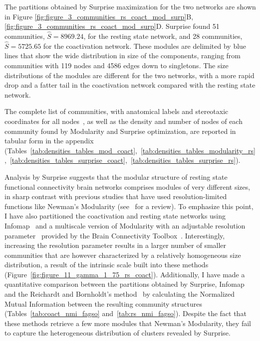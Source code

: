 The partitions obtained by Surprise maximization for the two networks are shown in Figure \ref{fig:figure_3_communities_rs_coact_mod_surp}B, \ref{fig:figure_3_communities_rs_coact_mod_surp}D. Surprise found 51 communities, $\hat{S}=8969.24$, for the resting state network, and 28 communities, $\hat{S}=5725.65$ for the coactivation network.
These modules are delimited by blue lines that show the wide distribution in size of the components, ranging from communities with 119 nodes and 4586 edges down to singletons.
The size distributions of the modules are different for the two networks, with a more rapid drop and a fatter tail in the coactivation network compared with the resting state network.

The complete list of communities, with anatomical labels and stereotaxic coordinates for all nodes~\cite{laird2010,lancaster2007,tzourio2002}, as well as the density and number of nodes of each community found by Modularity and Surprise optimization, are reported in tabular form in the appendix (Tables~\ref{tab:densities_tables_mod_coact},~\ref{tab:densities_tables_modularity_rs},~\ref{tab:densities_tables_surprise_coact},~\ref{tab:densities_tables_surprise_rs}).

Analysis by Surprise suggests that the modular structure of resting state functional connectivity brain networks comprises modules of very different sizes, in sharp contrast with previous studies that have used resolution-limited functions like Newman's Modularity (see~\cite{meunier2010} for a review).
To emphasize this point, I have also partitioned the coactivation and resting state networks using Infomap~\cite{rosvall2008} and a multiscale version of Modularity with an adjustable resolution parameter~\cite{reichardt2006} provided by the Brain Connectivity Toolbox~\cite{rubinov2010}.
Interestingly, increasing the resolution parameter results in a larger number of smaller communities that are however characterized by a relatively homogeneous size distribution, a result of the intrinsic scale built into these methods (Figure~\ref{fig:figure_11_gamma_1_75_rs_coact}).
Additionally, I have made a quantitative comparison between the partitions obtained by Surprise, Infomap and the Reichardt and Bornholdt's method~\cite{reichardt2006} by calculating the Normalized Mutual Information between the resulting community structures (Tables~\ref{tab:coact_nmi_fagso} and~\ref{tab:rs_nmi_fagso}). Despite the fact that these methods retrieve a few more modules that Newman's Modularity, they fail to capture the heterogeneous distribution of clusters revealed by Surprise. 

